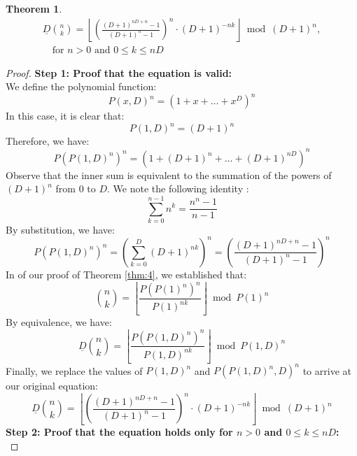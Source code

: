 \documentclass{article}
\theoremstyle{plain}
\newtheorem{thm}{Theorem}
\begin{document}
\begin{thm}
\label{thm:5}
\begin{align}
\underline{D}\binom{n}{k} = \left\lfloor \left(\frac{(D+1)^{nD+n} - 1}{(D+1)^{n} - 1}\right)^n \cdot (D + 1)^{-n k}\right\rfloor \bmod (D + 1)^n, \\ \quad \text{for } n > 0 \text{ and } 0 \leq k \leq nD
\end{align}
\end{thm}
\begin{proof}
\textbf{Step 1: Proof that the equation is valid:} \\
We define the polynomial function:
\begin{equation}
P(x,D)^n = (1 + x + \ldots + x^D)^n
\end{equation}
In this case, it is clear that:
\begin{equation}
P(1,D)^n = (D + 1)^n
\end{equation}
Therefore, we have:
\begin{equation}
P(P(1,D)^n)^n = (1 + (D+1)^n + \ldots + (D+1)^{n D})^n
\end{equation}
Observe that the inner sum is equivalent to the summation of the powers of $(D+1)^n$ from $0$ to $D$. We note the following identity \cite{A023037}:
\begin{equation}
\sum_{k=0}^{n-1} n^k = \frac{n^{n} - 1}{n - 1}
\end{equation}
By substitution, we have:
\begin{equation}
P(P(1,D)^n)^n = \left(\sum_{k=0}^{D} (D+1)^{nk}\right)^n = \left(\frac{(D+1)^{nD+n} - 1}{(D+1)^{n} - 1}\right)^n
\end{equation}
In of our proof of Theorem \ref{thm:4}, we established that:
\begin{equation}
\binom{n}{k} = \left\lfloor\frac{P(P(1)^n)^{n}}{P(1)^{n k}}\right\rfloor \bmod{P(1)^{n}}
\end{equation}
By equivalence, we have:
\begin{equation}
\underline{D}\binom{n}{k} = \left\lfloor\frac{P(P(1,D)^n)^{n}}{P(1,D)^{n k}}\right\rfloor \bmod{P(1,D)^{n}}
\end{equation}
Finally, we replace the values of $P(1,D)^n$ and $P(P(1,D)^n,D)^n$ to arrive at our original equation:
\begin{equation}
\underline{D}\binom{n}{k} = \left\lfloor \left(\frac{(D+1)^{nD+n} - 1}{(D+1)^{n} - 1}\right)^n \cdot (D + 1)^{-n k}\right\rfloor \bmod (D + 1)^n
\end{equation}
\textbf{Step 2: Proof that the equation holds only for $n > 0$ and $0 \leq k \leq nD$:} \\

\end{proof}
\end{document}
